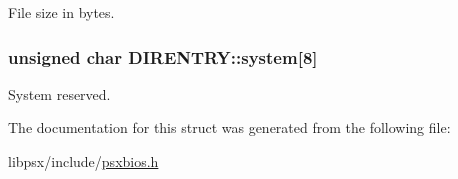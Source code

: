 File size in bytes. 

\hypertarget{structDIRENTRY_af4a5a4c764708f42c4f4396705e0b461}{}
\subsubsection[{system}]{\setlength{\rightskip}{0pt plus 5cm}unsigned char D\+I\+R\+E\+N\+T\+R\+Y\+::system\mbox{[}8\mbox{]}}\label{structDIRENTRY_af4a5a4c764708f42c4f4396705e0b461}


System reserved. 



The documentation for this struct was generated from the following file\+:\begin{DoxyCompactItemize}
\item 
libpsx/include/\hyperlink{psxbios_8h}{psxbios.\+h}\end{DoxyCompactItemize}
